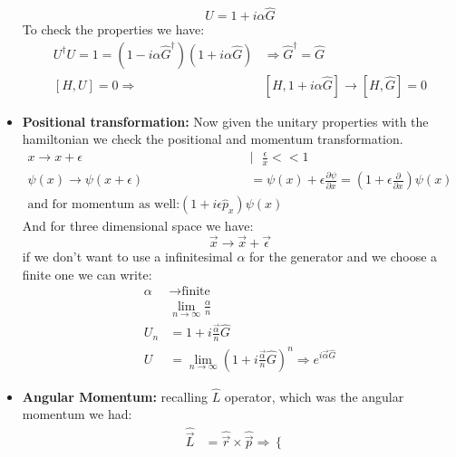 \documentclass[10pt,a4paper]{article}
\newcommand{\hatvec}[1]{\hat{\vec #1}}
\begin{document}
\begin{itemize}
               \begin{equation}
                    U = 1 + i\alpha \hat G
               \end{equation}
               To check the properties we have:
               \begin{align*}
                    U^\dagger U = 1 = (1-i\alpha\hat{G}^\dagger)(1+i\alpha\hat G) &\Rightarrow \hat{G}^\dagger = \hat G
                    \\
                    [H, U] = 0 \Rightarrow &[H, 1+i\alpha \hat G]\rightarrow [H,\hat G] = 0
               \end{align*}
               \item \textbf{Positional transformation:} Now given the unitary properties with the hamiltonian we check the positional and momentum transformation.
               \begin{align*}
                    x \rightarrow x +\epsilon \ \ \ &| \ \ \  \frac{\epsilon}{x}<<1\\
                    \psi(x) \rightarrow \psi(x+\epsilon) &= \psi(x) + \epsilon\frac{\partial\psi}{\partial x} = (1+\epsilon\frac{\partial}{\partial x})\psi(x)\\
                    \text{and for momentum as well:}
                    (1+i\epsilon\hat p_x)\psi(x)
               \end{align*}
               And for three dimensional space we have:
               \begin{equation}
                    \vec x \rightarrow\vec x + \vec \epsilon
               \end{equation}
               if we don't want to use a infinitesimal $\alpha$ for the generator and we choose a finite one we can write:
               \begin{align*}
                    \alpha &\rightarrow \text{finite} \\
                    &\lim_{n\rightarrow \infty}\frac{\alpha}{n}\\
                    U_n &= 1+ i\frac{\vec \alpha}{n}\hat G\\
                    U &= \lim_{n\rightarrow\infty}(1+i\frac{\vec \alpha}{n}\hat G)^n \Rightarrow e^{i\vec \alpha \hat G}
               \end{align*}
               \item \textbf{Angular Momentum:} recalling $\hat L$ operator, which was the angular momentum we had:
               \begin{align}
                    \hat{\vec L} &= \hat{\vec r}\times\hatvec p\Rightarrow\left\{\begin{matrix}

\end{matrix}
\end{align}
\end{itemize}
\end{document}
